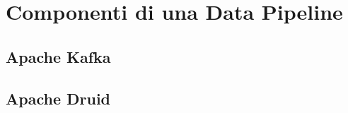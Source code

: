 \chapter{Componenti di una Data Pipeline}\label{cap:Componenti di una Data Pipeline}
\section{Apache Kafka}

\section{Apache Druid}


\newpage
\pagestyle{empty}
\null %
\newpage